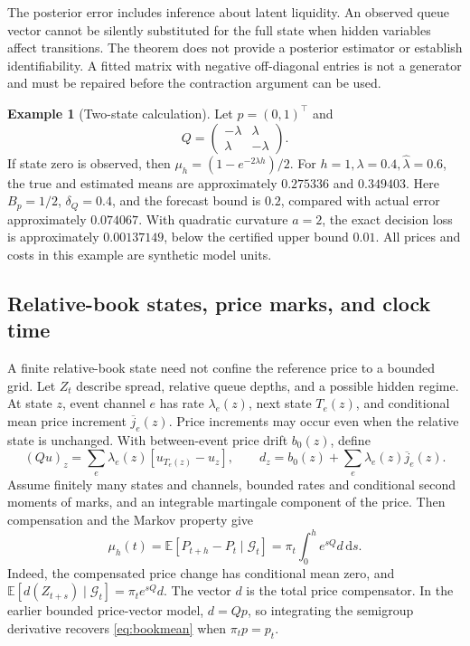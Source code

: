 \documentclass[11pt]{article}
\theoremstyle{plain}
\theoremstyle{definition}
\newtheorem{example}[theorem]{Example}
\theoremstyle{remark}
\newcommand{\E}{\mathbb E}
\newcommand{\dd}{\,\mathrm d}
\begin{document}
The posterior error includes inference about latent liquidity.
An observed queue vector cannot be silently substituted for the
full state when hidden variables affect transitions.
The theorem does not provide a posterior estimator or establish
identifiability. A fitted matrix with negative off-diagonal entries is
not a generator and must be repaired before the contraction argument
can be used.

\begin{example}[Two-state calculation]\label{ex:twostate}
Let \(p=(0,1)^\top\) and
\[
Q=\begin{pmatrix}-\lambda&\lambda\\\lambda&-\lambda\end{pmatrix}.
\]
If state zero is observed, then \(\mu_h=(1-e^{-2\lambda h})/2\).
For \(h=1,\lambda=0.4,\widehat\lambda=0.6\), the true and estimated
means are approximately \(0.275336\) and \(0.349403\).
Here \(B_p=1/2\), \(\delta_Q=0.4\), and the forecast bound is \(0.2\),
compared with actual error approximately \(0.074067\).
With quadratic curvature \(a=2\), the exact decision loss is
approximately \(0.00137149\), below the certified upper bound \(0.01\).
All prices and costs in this example are synthetic model units.
\end{example}

\subsection{Relative-book states, price marks, and clock time}

A finite relative-book state need not confine the reference price to
a bounded grid. Let \(Z_t\) describe spread, relative queue depths, and
a possible hidden regime. At state \(z\), event channel \(e\) has rate
\(\lambda_e(z)\), next state \(T_e(z)\), and conditional mean price
increment \(\overline j_e(z)\). Price increments may occur even when
the relative state is unchanged. With between-event price drift
\(b_0(z)\), define
\begin{equation}\label{eq:markedbookgenerator}
 (Qu)_z=\sum_e\lambda_e(z)[u_{T_e(z)}-u_z],\qquad
 d_z=b_0(z)+\sum_e\lambda_e(z)\overline j_e(z).
\end{equation}
Assume finitely many states and channels, bounded rates and conditional
second moments of marks, and an integrable martingale component of the
price. Then compensation and the Markov property give
\begin{equation}\label{eq:additiveforecast}
 \mu_h(t)=\E[P_{t+h}-P_t\mid\mathcal G_t]
 =\pi_t\int_0^h e^{sQ}d\dd s.
\end{equation}
Indeed, the compensated price change has conditional mean zero, and
\(\E[d(Z_{t+s})\mid\mathcal G_t]=\pi_t e^{sQ}d\).
The vector \(d\) is the total price compensator. In the earlier bounded
price-vector model, \(d=Qp\), so integrating the semigroup derivative
recovers \eqref{eq:bookmean} when \(\pi_t p=p_t\).
\end{document}
